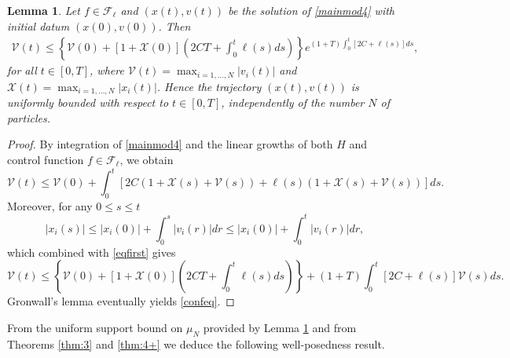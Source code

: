 \documentclass[11pt]{article}
\theoremstyle{plain}
\newtheorem{lemma}[theorem]{Lemma}
\theoremstyle{definition}
\theoremstyle{remark}
\numberwithin{equation}{section}
\begin{document}
\begin{lemma}\label{lem:conf}
Let $f \in \mathcal F_\ell$ and $(x(t),v(t))$ be the solution of \eqref{mainmod4} with initial datum $(x(0),v(0))$. Then
\begin{eqnarray}\label{confeq}
\mathcal V(t) \leq \left \{ \mathcal V(0) + [1+ \mathcal X(0)]\left (2CT+\int_0^t \ell(s) ds \right)\right \} e^{(1+T) \int_0^t [2C + \ell(s)] ds},
\end{eqnarray}
for all $t \in [0,T]$, where  $\mathcal V(t) = \max_{i=1,\dots, N} |v_i(t)|$ and $\mathcal X(t)= \max_{i=1,\dots,N} | x_i(t)|$. Hence the trajectory $(x(t),v(t))$ is uniformly bounded with respect to $t \in [0,T]$, independently of the number $N$ of particles.
\end{lemma}
\begin{proof}
By integration of \eqref{mainmod4} and the linear growths of both $H$ and control function $f \in \mathcal F_\ell$, we obtain
\begin{equation}\label{eqfirst}
\mathcal V(t) \leq \mathcal V(0) + \int_0^t [2C(1+\mathcal X(s) + \mathcal V(s)) + \ell(s)(1+ \mathcal X(s)+ \mathcal V(s))] ds.
\end{equation}
Moreover, for any $0\leq s \leq t$
$$
|x_i(s)| \leq |x_i(0)| + \int_0^s |v_i(r)| dr \leq |x_i(0)| + \int_0^t |v_i(r)| dr,
$$
which combined with \eqref{eqfirst} gives
$$
\mathcal V(t) \leq \left \{ \mathcal V(0) + [1+ \mathcal X(0)] \left (2CT+\int_0^t \ell(s) ds \right) \right \}+ (1+T)\int_0^t [2C + \ell(s)] \mathcal V(s) ds.
$$
Gronwall's lemma eventually yields \eqref{confeq}.
\end{proof}
From the uniform support bound on $\mu_N$ provided by Lemma \ref{lem:conf} and from Theorems \ref{thm:3} and \ref{thm:4+} we deduce the following well-posedness result.
\end{document}
